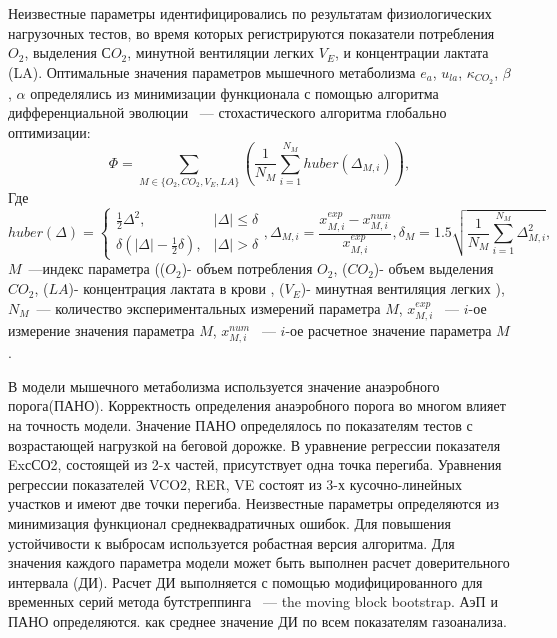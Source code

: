 Неизвестные параметры идентифицировались по результатам физиологических нагрузочных тестов, во время которых регистрируются показатели потребления \(O_{2}\), выделения \(СO_{2}\), минутной вентиляции легких \(V_{E}\), и концентрации лактата (LA). 
Оптимальные значения параметров мышечного метаболизма $e_{a}$, $u_{la}$, $\kappa_{CO_{2}}$, $\beta$, $\alpha$ определялись из минимизации функционала с помощью алгоритма дифференциальной эволюции ~--- стохастического алгоритма глобально оптимизации:
\begin{equation} \label{eq:functional}
\Phi = \sum \limits_{M \in \{O_2, CO_2, V_E, LA\}} \left( \frac{1}{N_M}\sum_{i=1}^{N_M} huber\left(\Delta_{M,i}\right) \right),
\end{equation}
\noindent Где
\begin{equation} \label{eq:huber}
huber(\Delta)=\begin{cases}
\frac{1}{2}\Delta^2,& |\Delta| \le \delta\\
\delta(|\Delta|-\frac{1}{2}\delta),& |\Delta| > \delta
\end{cases}, 
\Delta_{M,i}=\frac{x_{M,i}^{exp}-x_{M,i}^{num}}{x_{M,i}^{exp}}, \delta_M = 1.5\sqrt{\frac{1}{N_M}\sum_{i=1}^{N_M}\Delta_{M, i}^{2}},
\end{equation}
\noindent $M$~---индекс параметра (($O_{2}$)- объем потребления $O_{2}$, ($CO_2$)- объем выделения $CO_{2}$, ($LA$)- концентрация лактата в крови , ($V_E$)- минутная вентиляция легких ), $N_M$~--- количество экспериментальных измерений параметра $M$, $x_{M,i}^{exp}$ ~--- $i$-ое измерение значения параметра $M$, $x_{M,i}^{num}$ ~--- $i$-ое расчетное значение параметра $M$.

В модели мышечного метаболизма используется значение анаэробного порога(ПАНО). Корректность определения анаэробного порога во многом влияет на точность модели. Значение ПАНО определялось по показателям тестов с возрастающей нагрузкой на беговой дорожке.  В уравнение регрессии показателя ExсСО2, состоящей из 2-х частей, присутствует одна точка перегиба. Уравнения регрессии показателей VCO2, RER, VE состоят из 3-х кусочно-линейных участков и имеют две точки перегиба. Неизвестные параметры определяются из минимизация функционал среднеквадратичных ошибок. Для повышения устойчивости к выбросам используется робастная версия алгоритма. Для значения каждого параметра модели может быть выполнен расчет доверительного интервала (ДИ). Расчет ДИ выполняется с помощью модифицированного для временных серий метода бутстреппинга ~--- the moving block bootstrap. АэП и ПАНО определяются. как среднее значение ДИ по всем показателям газоанализа. 

